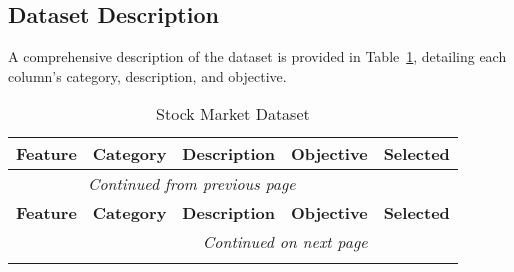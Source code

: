 \begin{landscape}

\clearpage
\subsection{Dataset Description}
\label{app:dataset}

A comprehensive description of the dataset is provided in 
Table~\ref{tab:dataset_structure}, detailing each column's category, 
description, and objective.

\begin{longtable}{llp{8cm}p{8cm}p{1.5cm}}
    \caption{Stock Market Dataset}
    \label{tab:dataset_structure} \\
    \hline
    \textbf{Feature} & \textbf{Category} & \textbf{Description} & \textbf{Objective} & \textbf{Selected}  \\
    \hline\hline
    \endfirsthead

    \multicolumn{4}{c}{\textit{Continued from previous page}} \\
    \hline
    \textbf{Feature} & \textbf{Category} & \textbf{Description} & \textbf{Objective} & \textbf{Selected} \\
    \hline\hline
    \endhead

    \hline \multicolumn{4}{r}{\textit{Continued on next page}} \\
    \endfoot


\end{longtable}
\end{landscape}
